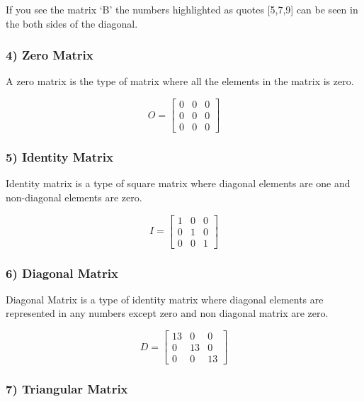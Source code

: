 \documentclass[11pt]{article}
\begin{document}
If you see the matrix `B' the numbers highlighted as quotes {[}5,7,9{]}
can be seen in the both sides of the diagonal.

\hypertarget{zero-matrix}{%
\subsubsection{4) Zero Matrix}\label{zero-matrix}}

A zero matrix is the type of matrix where all the elements in the matrix
is zero.

\[
O = \begin{bmatrix}
0 & 0 & 0 \\
0 & 0 & 0 \\
0 & 0 & 0
\end{bmatrix}
\]

\hypertarget{identity-matrix}{%
\subsubsection{5) Identity Matrix}\label{identity-matrix}}

Identity matrix is a type of square matrix where diagonal elements are
one and non-diagonal elements are zero.

\[
I = \begin{bmatrix}
1 & 0 & 0 \\
0 & 1 & 0 \\
0 & 0 & 1
\end{bmatrix}
\]

\hypertarget{diagonal-matrix}{%
\subsubsection{6) Diagonal Matrix}\label{diagonal-matrix}}

Diagonal Matrix is a type of identity matrix where diagonal elements are
represented in any numbers except zero and non diagonal matrix are zero.

\[
D = \begin{bmatrix}
13 & 0 & 0 \\
0 & 13 & 0 \\
0 & 0 & 13
\end{bmatrix}
\]

\hypertarget{triangular-matrix}{%
\subsubsection{7) Triangular Matrix}\label{triangular-matrix}}
\end{document}
